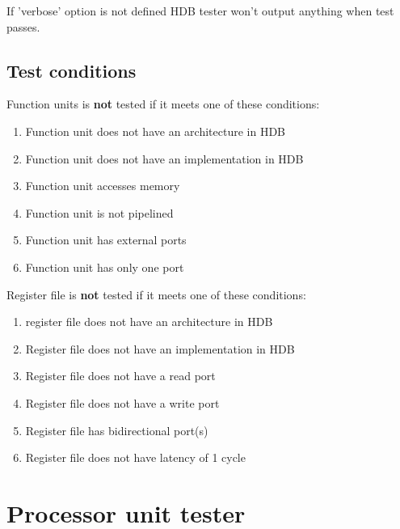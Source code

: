 \documentclass[a4paper,twoside]{tceusermanual}
\begin{document}
If 'verbose' option is not defined HDB tester won't output anything when test
passes.

\subsection{Test conditions}

Function units is \textbf{not} tested if it meets one of these conditions:

\begin{enumerate}
 \item Function unit does not have an architecture in HDB

 \item Function unit does not have an implementation in HDB

 \item Function unit accesses memory

 \item Function unit is not pipelined

 \item Function unit has external ports

 \item Function unit has only one port
\end{enumerate}

Register file is \textbf{not} tested if it meets one of these conditions:

\begin{enumerate}
 \item register file does not have an architecture in HDB

 \item Register file does not have an implementation in HDB

 \item Register file does not have a read port

 \item Register file does not have a write port

 \item Register file has bidirectional port(s)

 \item Register file does not have latency of 1 cycle
\end{enumerate}


\section{Processor unit tester}
\end{document}
